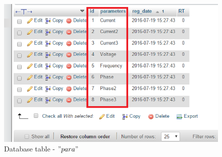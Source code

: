 \documentclass[a4paper,12pt,oneside]{book}
\begin{document}
\begin{itemize}
\begin{itemize}
\begin{itemize}
			\begin{figure}[H]
				\centering
				\includegraphics[width=15cm]{para.png}
				\caption{Database table - $"para"$}
				\label{2}
			\end{figure}
			

\end{itemize}
\end{itemize}
\end{itemize}
\end{document}
